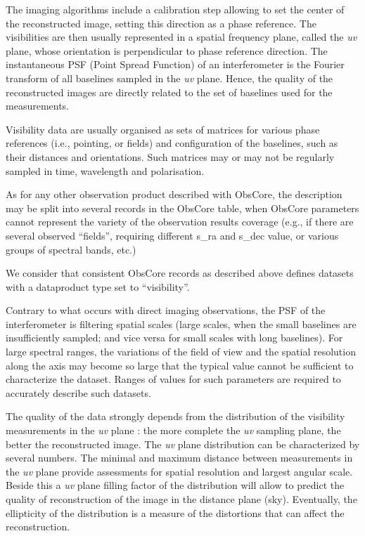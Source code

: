 \documentclass[11pt,a4paper]{ivoa}
\begin{document}
The imaging algorithms include a calibration step allowing to set the center of the
reconstructed image, setting this direction as a phase reference. The visibilities
are then usually represented in a spatial frequency plane, called the \emph{uv} plane,
whose orientation is perpendicular to phase reference direction. The instantaneous PSF
(Point Spread Function) of an interferometer is the Fourier transform of all baselines
sampled in the \emph{uv} plane. Hence, the quality of the reconstructed images are
directly related to the set of baselines used for the measurements.

Visibility data are usually organised as sets of matrices for various phase references
(i.e., pointing, or fields) and configuration of the baselines, such as their
distances and orientations. Such matrices may or may not be regularly sampled in time,
wavelength and polarisation.

As for any other observation product described with ObsCore, the description may be split into
several records in the ObsCore table, when ObsCore parameters cannot represent the
variety of the observation results coverage (e.g., if there are several observed ``fields'',
requiring different s\_ra and s\_dec value, or various groups of spectral bands, etc.)

We consider that consistent ObsCore records as described above defines datasets with
a dataproduct type set to ``visibility''.


Contrary to what occurs with direct imaging observations, the PSF of the interferometer
is filtering spatial scales (large scales, when the small baselines are insufficiently
sampled; and vice versa for small scales with long baselines).
For large spectral ranges, the variations of the field of view and the spatial resolution
along the axis may become so large that the typical value cannot be sufficient to
characterize the dataset. Ranges of values for such parameters are required to accurately
describe such datasets.

The quality of the data strongly depends from the distribution of the visibility measurements
in the \emph{uv} plane : the more complete the \emph{uv} sampling plane, the better the reconstructed image.
The \emph{uv} plane distribution can be characterized by several numbers.
The minimal and maximum distance between measurements in the \emph{uv} plane provide assessments for
spatial resolution and largest angular scale.
Beside this a \emph{uv} plane filling factor of the distribution will allow to predict the quality
of reconstruction of the image in the distance plane (sky).
Eventually, the ellipticity of the distribution is a measure of the distortions that can
affect the reconstruction.
\end{document}
